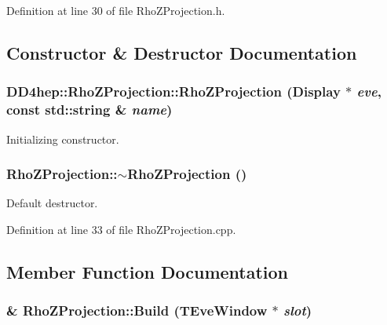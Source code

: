 Definition at line 30 of file RhoZProjection.h.

\subsection{Constructor \& Destructor Documentation}
\hypertarget{class_d_d4hep_1_1_rho_z_projection_a53e97713415f13369aa528096a8e5a6b}{
\subsubsection[{RhoZProjection}]{\setlength{\rightskip}{0pt plus 5cm}DD4hep::RhoZProjection::RhoZProjection ({\bf Display} $\ast$ {\em eve}, \/  const std::string \& {\em name})}}
\label{class_d_d4hep_1_1_rho_z_projection_a53e97713415f13369aa528096a8e5a6b}


Initializing constructor. \hypertarget{class_d_d4hep_1_1_rho_z_projection_a196da05dd078d07f9f05e2a6b3eb9f3a}{
\subsubsection[{$\sim$RhoZProjection}]{\setlength{\rightskip}{0pt plus 5cm}RhoZProjection::$\sim$RhoZProjection ()}}
\label{class_d_d4hep_1_1_rho_z_projection_a196da05dd078d07f9f05e2a6b3eb9f3a}


Default destructor. 

Definition at line 33 of file RhoZProjection.cpp.

\subsection{Member Function Documentation}
\hypertarget{class_d_d4hep_1_1_rho_z_projection_adc2e30a682bc645b5433d055774930ef}{
\subsubsection[{Build}]{ \& RhoZProjection::Build (TEveWindow $\ast$ {\em slot})}}
\label{class_d_d4hep_1_1_rho_z_projection_adc2e30a682bc645b5433d055774930ef}


